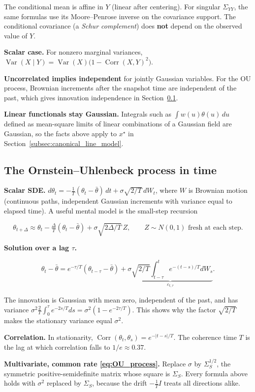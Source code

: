   The conditional mean is affine in $Y$ (linear after centering). For singular
$\Sigma_{YY}$, the same formulas use its Moore--Penrose inverse on the covariance support. The conditional covariance (a \emph{Schur complement}) does \textbf{not} depend on the observed value of $Y$.

\textbf{Scalar case.} For nonzero marginal variances, $\operatorname{Var}(X\mid Y)=\operatorname{Var}(X)\big(1-\operatorname{Corr}(X,Y)^2\big)$.

\textbf{Uncorrelated implies independent} for jointly Gaussian variables. For the OU process, Brownian increments after the snapshot time are independent
of the past, which gives innovation independence in Section~\ref{app:toolkit-4}.

\textbf{Linear functionals stay Gaussian.} Integrals such as $\int w(u)\theta(u)\,du$ defined as mean-square limits of linear combinations of a Gaussian field are Gaussian, so the facts above apply to $x^\star$ in Section~\ref{subsec:canonical_line_model}.

\subsection{The Ornstein--Uhlenbeck process in time}
\label{app:toolkit-4}
\textbf{Scalar SDE.} $d\theta_t=-\tfrac1T(\theta_t-\bar\theta)\,dt+\sigma\sqrt{2/T}\,dW_t$, where $W$ is Brownian motion (continuous paths, independent Gaussian increments with variance equal to elapsed time). A useful mental model is the small-step recursion

\[
\theta_{t+\Delta}\approx\theta_t-\tfrac{\Delta}{T}(\theta_t-\bar\theta)+\sigma\sqrt{2\Delta/T}\,Z,\qquad Z\sim N(0,1)\text{ fresh at each step}.
\]

\textbf{Solution over a lag $\tau$.}

\[
\theta_t-\bar\theta=e^{-\tau/T}(\theta_{t-\tau}-\bar\theta)+\underbrace{\sigma\sqrt{2/T}\int_{t-\tau}^{t}e^{-(t-s)/T}dW_s}_{\varepsilon_{t,\tau}} .
\]

  The innovation is Gaussian with mean zero, independent of the past, and has variance $\sigma^2\tfrac2T\int_0^\tau e^{-2s/T}ds=\sigma^2(1-e^{-2\tau/T})$. This shows why the factor $\sqrt{2/T}$ makes the stationary variance equal $\sigma^2$.

\textbf{Correlation.} In stationarity, $\operatorname{Corr}(\theta_t,\theta_s)=e^{-|t-s|/T}$. The coherence time $T$ is the lag at which correlation falls to $1/e\approx0.37$.

\textbf{Multivariate, common rate \eqref{eq:OU_process}.} Replace $\sigma$ by $\Sigma_S^{1/2}$, the symmetric positive-semidefinite matrix whose square is $\Sigma_S$. Every formula above holds with $\sigma^2$ replaced by $\Sigma_S$, because the drift $-\tfrac1T I$ treats all directions alike.

